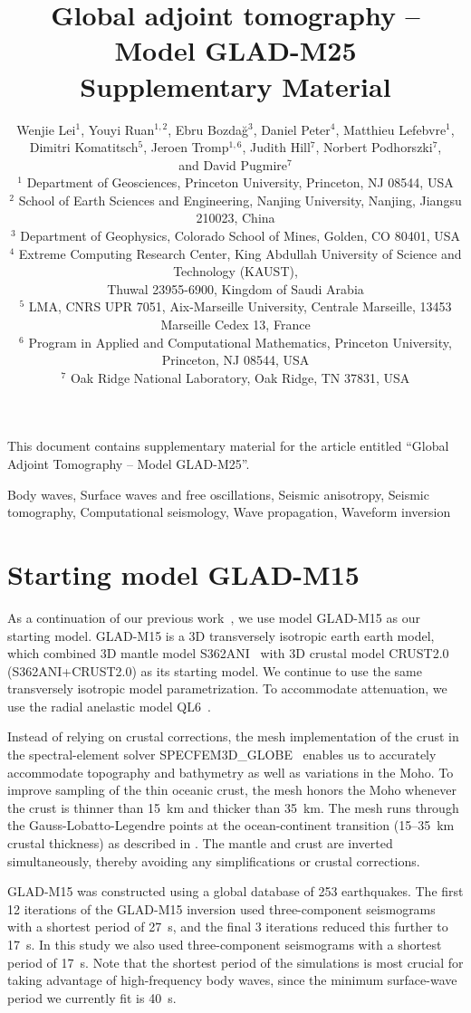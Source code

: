 \documentclass[extra,mreferee]{gji}
\title[Global Adjoint Tomography -- Model GLAD-M25 (Supplementary Material)]
  {Global adjoint tomography -- Model GLAD-M25 \\ Supplementary Material}
\author[Lei et al.]
  {Wenjie Lei$^1$, Youyi Ruan$^{1,2}$, Ebru Bozda\u g$^3$, Daniel Peter$^4$, Matthieu Lefebvre$^1$, \\{\LARGE \rm Dimitri Komatitsch$^5$, Jeroen Tromp$^{1,6}$, Judith Hill$^7$, Norbert Podhorszki$^7$}, \\ {\LARGE \rm and David Pugmire$^7$} \\
  $^1$ Department of Geosciences, Princeton University, Princeton, NJ 08544, USA\\
  $^2$ School of Earth Sciences and Engineering, Nanjing University, Nanjing, Jiangsu 210023, China\\
  $^3$ Department of Geophysics, Colorado School of Mines, Golden, CO 80401, USA\\
  $^4$ Extreme Computing Research Center, King Abdullah University of Science and Technology (KAUST), \\Thuwal 23955-6900, Kingdom of Saudi Arabia\\
  $^5$ LMA, CNRS UPR 7051, Aix-Marseille University, Centrale Marseille, 13453 Marseille Cedex 13, France\\
  $^6$ Program in Applied and Computational Mathematics, Princeton University, Princeton, NJ 08544, USA\\
  $^7$ Oak Ridge National Laboratory, Oak Ridge, TN 37831, USA\\
  }
\begin{document}
\maketitle

%
%
\begin{summary}
This document contains supplementary material for the article entitled ``Global Adjoint Tomography -- Model GLAD-M25''.
\end{summary}

\begin{keywords}
Body waves, Surface waves and free oscillations, Seismic anisotropy, Seismic tomography, Computational seismology, Wave propagation, Waveform inversion
\end{keywords}

\section{Starting model GLAD-M15}
\label{section:start}

As a continuation of our previous work~\citep{bozdaug2016global},
we use model GLAD-M15 as our
starting model.
GLAD-M15 is a 3D transversely isotropic earth earth model, which combined
3D mantle model S362ANI~\citep{kustowski2008anisotropic}
with 3D crustal model CRUST2.0~\citep{bassin2000current} (S362ANI+CRUST2.0) as its starting model.
We continue to use the same transversely isotropic model parametrization.
To accommodate attenuation,
we use the radial anelastic model QL6~\citep{QL6}.

Instead of relying on crustal corrections,
the mesh implementation of the crust in the spectral-element solver SPECFEM3D\_GLOBE~\citep{KoTr02a,KoTr02b,PeKoLuMaLeCaLeMaLiBlNiBaTr11} enables us to accurately accommodate topography and bathymetry as well as variations in the Moho.
To improve sampling of the thin oceanic crust, the mesh honors the Moho whenever the crust is thinner than 15~km and thicker than 35~km. The mesh runs through the Gauss-Lobatto-Legendre points at the ocean-continent transition (15--35~km crustal thickness) as described in \citet{tromp2010a}. The mantle and crust are inverted simultaneously,
thereby avoiding any simplifications or crustal corrections.

GLAD-M15 was constructed using a global database of 253 earthquakes.
The first 12 iterations of the GLAD-M15 inversion used three-component seismograms with a shortest period of 27~s,
and the final 3 iterations reduced this further to 17~s.
In this study we also used three-component seismograms with a shortest period of 17~s.
Note that the shortest period of the simulations is most crucial for taking advantage of high-frequency body waves, since the minimum surface-wave period we currently fit is 40~s. 
\end{document}
